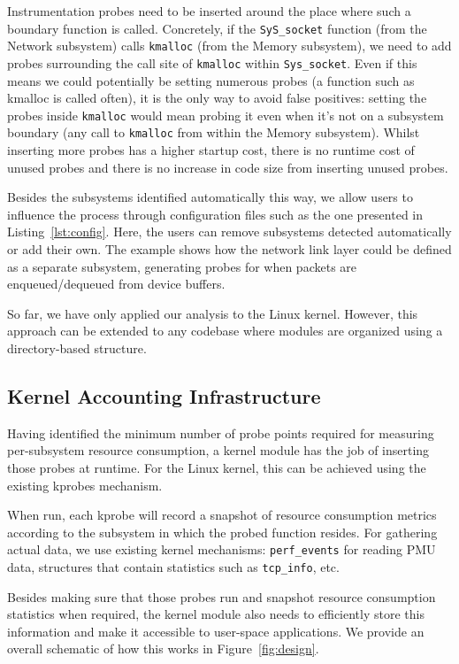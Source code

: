 \documentclass[letterpaper,twocolumn,10pt]{article}
\begin{document}
Instrumentation probes need to be inserted around the place where such a boundary
function is called. Concretely, if the \texttt{SyS\_socket} function (from the
Network subsystem) calls \texttt{kmalloc} (from the Memory subsystem), we need
to add probes surrounding the call site of \texttt{kmalloc} within
\texttt{Sys\_socket}. Even if this means we could potentially be setting
numerous probes (a function such as kmalloc is called often), it is the
only way to avoid false positives: setting the probes inside \texttt{kmalloc}
would mean probing it even when it's not on a subsystem boundary (any call to
\texttt{kmalloc} from within the Memory subsystem). Whilst inserting more probes
has a higher startup cost, there is no runtime cost of unused probes and there
is no increase in code size from inserting unused probes.

Besides the subsystems identified automatically this way, we allow users to
influence the process through configuration files such as the one presented in
Listing~\ref{lst:config}. Here, the users can remove subsystems detected
automatically or add their own. The example shows how the network link layer
could be defined as a separate subsystem, generating probes for when packets are
enqueued/dequeued from device buffers.

So far, we have only applied our analysis to the Linux kernel. However, this
approach can be extended to any codebase where modules are organized using a
directory-based structure.


\subsection{Kernel Accounting Infrastructure}

Having identified the minimum number of probe points required for measuring per-subsystem
resource consumption, a kernel module has the job of inserting those probes at runtime.
For the Linux kernel, this can be achieved using the existing kprobes mechanism.

When run, each kprobe will record a snapshot of resource consumption metrics according
to the subsystem in which the probed function resides. For gathering actual data, we
use existing kernel mechanisms: \texttt{perf\_events} for reading PMU data, structures
that contain statistics such as \texttt{tcp\_info}, etc.

Besides making sure that those probes run and snapshot resource consumption statistics
when required, the kernel module also needs to efficiently store this information
and make it accessible to user-space applications. We provide an overall schematic of
how this works in Figure~\ref{fig:design}.
\end{document}
